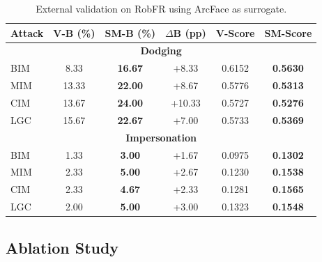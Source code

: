 \documentclass[a4paper,fleqn]{cas-dc}
\begin{document}
\begin{table}[t]
\centering
\caption{External validation on RobFR using ArcFace as surrogate.}
\label{tab:robfr_validation}
\setlength{\tabcolsep}{3pt}
\renewcommand{\arraystretch}{1.15}
\small
\begin{tabularx}{\columnwidth}{lccccc}
\toprule
Attack & V-B (\%) & SM-B (\%) & $\Delta$B (pp) & V-Score & SM-Score \\
\midrule
\multicolumn{6}{c}{\textbf{Dodging}} \\
\midrule
BIM & 8.33 & \textbf{16.67} & +8.33 & 0.6152 & \textbf{0.5630} \\
MIM & 13.33 & \textbf{22.00} & +8.67 & 0.5776 & \textbf{0.5313} \\
CIM & 13.67 & \textbf{24.00} & +10.33 & 0.5727 & \textbf{0.5276} \\
LGC & 15.67 & \textbf{22.67} & +7.00 & 0.5733 & \textbf{0.5369} \\
\midrule
\multicolumn{6}{c}{\textbf{Impersonation}} \\
\midrule
BIM & 1.33 & \textbf{3.00} & +1.67 & 0.0975 & \textbf{0.1302} \\
MIM & 2.33 & \textbf{5.00} & +2.67 & 0.1230 & \textbf{0.1538} \\
CIM & 2.33 & \textbf{4.67} & +2.33 & 0.1281 & \textbf{0.1565} \\
LGC & 2.00 & \textbf{5.00} & +3.00 & 0.1323 & \textbf{0.1548} \\
\bottomrule
\end{tabularx}
\end{table}

\subsection{Ablation Study}
\end{document}
